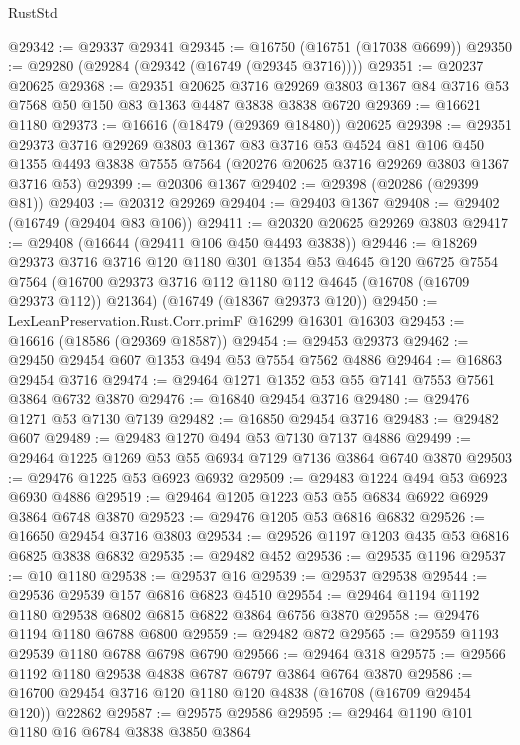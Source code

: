 \begin{lexlean}{RustStd}
\begin{coremodule}
@29342 := @29337 @29341
@29345 := @16750 (@16751 (@17038 @6699))
@29350 := @29280 (@29284 (@29342 (@16749 (@29345 @3716))))
@29351 := @20237 @20625
@29368 := @29351
    @20625
    @3716
    @29269
    @3803
    @1367
    @84
    @3716
    @53
    @7568
    @50
    @150
    @83
    @1363
    @4487
    @3838
    @3838
    @6720
@29369 := @16621 @1180
@29373 := @16616 (@18479 (@29369 @18480)) @20625
@29398 := @29351
    @29373
    @3716
    @29269
    @3803
    @1367
    @83
    @3716
    @53
    @4524
    @81
    @106
    @450
    @1355
    @4493
    @3838
    @7555
    @7564
    (@20276 @20625 @3716 @29269 @3803 @1367 @3716 @53)
@29399 := @20306 @1367
@29402 := @29398 (@20286 (@29399 @81))
@29403 := @20312 @29269
@29404 := @29403 @1367
@29408 := @29402 (@16749 (@29404 @83 @106))
@29411 := @20320 @20625 @29269 @3803
@29417 := @29408 (@16644 (@29411 @106 @450 @4493 @3838))
@29446 := @18269
    @29373
    @3716
    @3716
    @120
    @1180
    @301
    @1354
    @53
    @4645
    @120
    @6725
    @7554
    @7564
    (@16700 @29373 @3716 @112 @1180 @112 @4645 (@16708 (@16709 @29373 @112)) @21364)
    (@16749 (@18367 @29373 @120))
@29450 := LexLeanPreservation.Rust.Corr.primF @16299 @16301 @16303
@29453 := @16616 (@18586 (@29369 @18587))
@29454 := @29453 @29373
@29462 := @29450 @29454 @607 @1353 @494 @53 @7554 @7562 @4886
@29464 := @16863 @29454 @3716
@29474 := @29464 @1271 @1352 @53 @55 @7141 @7553 @7561 @3864 @6732 @3870
@29476 := @16840 @29454 @3716
@29480 := @29476 @1271 @53 @7130 @7139
@29482 := @16850 @29454 @3716
@29483 := @29482 @607
@29489 := @29483 @1270 @494 @53 @7130 @7137 @4886
@29499 := @29464 @1225 @1269 @53 @55 @6934 @7129 @7136 @3864 @6740 @3870
@29503 := @29476 @1225 @53 @6923 @6932
@29509 := @29483 @1224 @494 @53 @6923 @6930 @4886
@29519 := @29464 @1205 @1223 @53 @55 @6834 @6922 @6929 @3864 @6748 @3870
@29523 := @29476 @1205 @53 @6816 @6832
@29526 := @16650 @29454 @3716 @3803
@29534 := @29526 @1197 @1203 @435 @53 @6816 @6825 @3838 @6832
@29535 := @29482 @452
@29536 := @29535 @1196
@29537 := @10 @1180
@29538 := @29537 @16
@29539 := @29537 @29538
@29544 := @29536 @29539 @157 @6816 @6823 @4510
@29554 := @29464 @1194 @1192 @1180 @29538 @6802 @6815 @6822 @3864 @6756 @3870
@29558 := @29476 @1194 @1180 @6788 @6800
@29559 := @29482 @872
@29565 := @29559 @1193 @29539 @1180 @6788 @6798 @6790
@29566 := @29464 @318
@29575 := @29566 @1192 @1180 @29538 @4838 @6787 @6797 @3864 @6764 @3870
@29586 := @16700 @29454 @3716 @120 @1180 @120 @4838 (@16708 (@16709 @29454 @120)) @22862
@29587 := @29575 @29586
@29595 := @29464 @1190 @101 @1180 @16 @6784 @3838 @3850 @3864

\end{coremodule}
\end{lexlean}
